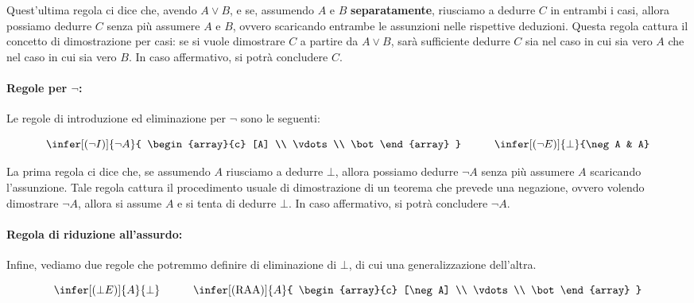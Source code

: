 Quest'ultima regola ci dice che, avendo \(A \lor B\), e se, assumendo \(A\) e \(B\) \textbf{separatamente}, riusciamo a dedurre \(C\) in entrambi i casi, allora possiamo dedurre \(C\) senza più assumere \(A\) e \(B\), ovvero scaricando entrambe le assunzioni nelle rispettive deduzioni.
Questa regola cattura il concetto di dimostrazione per casi: se si vuole dimostrare \(C\) a partire da \(A \lor B\), sarà sufficiente dedurre \(C\) sia nel caso in cui sia vero \(A\) che nel caso in cui sia vero \(B\). In caso affermativo, si potrà concludere \(C\).
 
\paragraph{Regole per \(\neg\):}

Le regole di introduzione ed eliminazione per \(\neg\) sono le seguenti:

\begin{equation*}
  \infer[(\neg I)]{\neg A}{
    \begin{array}{c}
    [A] \\
    \vdots \\
    \bot
  \end{array}
  } \quad\quad\quad
  \infer[(\neg E)]{\bot}{\neg A & A}
\end{equation*}

La prima regola ci dice che, se assumendo \(A\) riusciamo a dedurre \(\bot\), allora possiamo dedurre \(\neg A\) senza più assumere \(A\) scaricando l'assunzione. Tale regola cattura il procedimento usuale di dimostrazione di un teorema che prevede una negazione, ovvero volendo dimostrare \(\neg A\), allora si assume \(A\) e si tenta di dedurre \(\bot\). In caso affermativo, si potrà concludere \(\neg A\).

\paragraph{Regola di riduzione all'assurdo:}

Infine, vediamo due regole che potremmo definire di eliminazione di \(\bot\), di cui una generalizzazione dell'altra.

\begin{equation*}
  \infer[(\bot E)]{A}{\bot} \quad\quad\quad
  \infer[(\RAA)]{A}{
    \begin{array}{c}
    [\neg A] \\
    \vdots \\
    \bot
  \end{array}
  }
\end{equation*}

